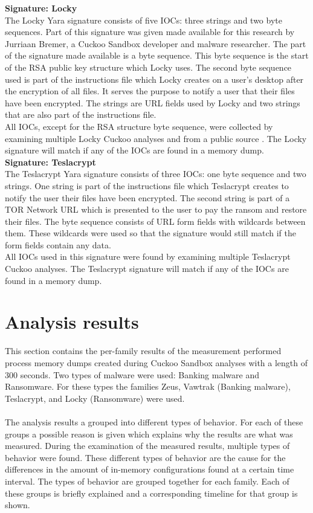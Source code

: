 \documentclass[conference]{IEEEtran}
\begin{document}
\textbf{Signature: Locky}
\\The Locky Yara signature consists of five IOCs: three strings and two byte sequences. Part of this signature was given made available for this research by Jurriaan Bremer, a Cuckoo Sandbox developer and malware researcher. The part of the signature made available is a byte sequence. This byte sequence is the start of the RSA public key structure which Locky uses. The second byte sequence used is part of the instructions file which Locky creates on a user's desktop after the encryption of all files. It serves the purpose to notify a user that their files have been encrypted. The strings are URL fields used by Locky and two strings that are also part of the instructions file.\\All IOCs, except for the RSA structure byte sequence, were collected by examining multiple Locky Cuckoo analyses and from a public source \cite{nelson-locky}. The Locky signature will match if any of the IOCs are found in a memory dump.\\

\textbf{Signature: Teslacrypt}
\\The Teslacrypt Yara signature consists of three IOCs: one byte sequence and two strings. One string is part of the instructions file which Teslacrypt creates to notify the user their files have been encrypted. The second string is part of a TOR Network URL which is presented to the user to pay the ransom and restore their files. The byte sequence consists of URL form fields with wildcards between them. These wildcards were used so that the signature would still match if the form fields contain any data.\\All IOCs used in this signature were found by examining multiple Teslacrypt Cuckoo analyses. The Teslacrypt signature will match if any of the IOCs are found in a memory dump.\\


\section{Analysis results}
This section contains the per-family results of the measurement performed process memory dumps created during Cuckoo Sandbox analyses with a length of 300 seconds. Two types of malware were used: Banking malware and Ransomware.  For these types the families Zeus, Vawtrak (Banking malware), Teslacrypt, and Locky (Ransomware) were used.\\\\ The analysis results a grouped into different types of behavior. For each of these groups a possible reason is given which explains why the results are what was measured. During the examination of the measured results, multiple types of behavior were found. These different types of behavior are the cause for the differences in the amount of in-memory configurations found at a certain time interval. The types of behavior are grouped together for each family. Each of these groups is briefly explained and a corresponding timeline for that group is shown.
\end{document}
